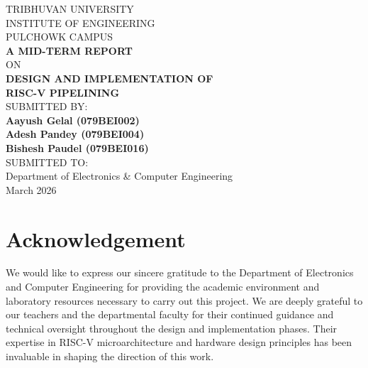 \documentclass[12pt,a4paper]{report}
\begin{document}

\begin{titlepage}
\centering


{\Large TRIBHUVAN UNIVERSITY}\\
{\Large INSTITUTE OF ENGINEERING}\\
{\Large PULCHOWK CAMPUS}\\[1cm]

{\bfseries\LARGE A MID-TERM REPORT}\\[0.5cm]
{\Large ON}\\[0.5cm]
{\bfseries\LARGE DESIGN AND IMPLEMENTATION OF \\[0.3cm] RISC-V PIPELINING}\\[2cm]

SUBMITTED BY:\\[0.3cm]
\textbf{Aayush Gelal (079BEI002)}\\
\textbf{Adesh Pandey (079BEI004)}\\
\textbf{Bishesh Paudel (079BEI016)}\\[1cm]

SUBMITTED TO:\\
Department of Electronics \& Computer Engineering\\[1cm]

March 2026
\end{titlepage}

\clearpage
{}

\chapter*{Acknowledgement}

We would like to express our sincere gratitude to the Department of Electronics and
Computer Engineering for providing the academic environment and laboratory resources
necessary to carry out this project. We are deeply grateful to our teachers and the
departmental faculty for their continued guidance and technical oversight throughout the
design and implementation phases. Their expertise in RISC-V microarchitecture and
hardware design principles has been invaluable in shaping the direction of this work.
\end{document}
